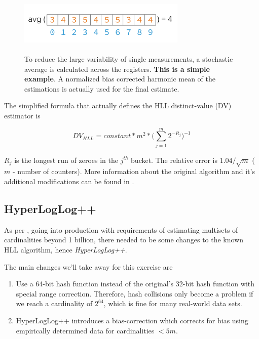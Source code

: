\documentclass[12pt]{article}
\begin{document}
\begin{figure}[H]
\centering
\includegraphics[width=8.0cm, height=3cm]{sto-avg}
\caption{To reduce the large variability of single measurements, a stochastic
  average is calculated across the registers. \textbf{This is a simple example}.
  A normalized bias corrected harmonic mean of the estimations is actually used
  for the final estimate.}
\label{figurestoaverage}
\end{figure}

The simplified formula that actually defines the HLL distinct-value (DV)
estimator\cite{Neustar:Online} is

$$DV_{HLL} = constant * m^{2} * \Bigg(\sum_{j=1}^{m} 2^{-R_{j}}\Bigg)^{-1}$$

$R_j$ is the longest run of zeroes in the $j^{th}$ bucket. The relative error
is $1.04/\sqrt{m}$ ($m$ - number of counters). More information about the
original algorithm and it's additional modifications can be found in
\cite{Flatjolet:2007:Online}.

\subsection{HyperLogLog++}\label{hll++}

As per \cite{Heule:2013:Online}, going into production with requirements of
estimating multisets of cardinalities beyond 1 billion, there needed to be
some changes to the known HLL algorithm, hence \textit{HyperLogLog++}.\newline

The main changes we'll take away for this exercise are

\begin{enumerate}
\item Use a 64-bit hash function instead of the
  original's\cite{Flatjolet:2007:Online} 32-bit hash function with special range
  correction. Therefore, hash collisions only become a problem if we reach a
  cardinality of $2^{64}$, which is fine for many real-world data sets.
\item HyperLogLog++ introduces a bias-correction which corrects for bias
  using empirically determined data for cardinalities $< 5m$.
\end{enumerate}
\end{document}
